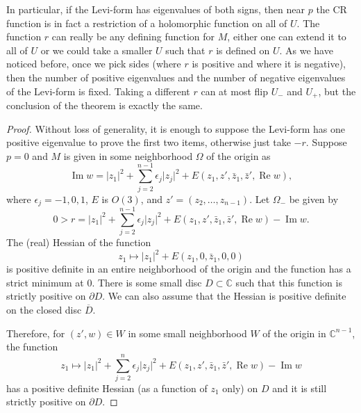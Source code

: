\documentclass[12pt,openany]{book}
\renewcommand{\Re}{\operatorname{Re}}
\renewcommand{\Im}{\operatorname{Im}}
\newcommand{\sabs}[1]{\lvert {#1} \rvert}
\newcommand{\C}{{\mathbb{C}}}
\theoremstyle{plain}
\theoremstyle{remark}
\theoremstyle{definition}
\theoremstyle{exercise}
\theoremstyle{example}
\begin{document}
In particular, if the Levi-form has eigenvalues of both signs,
then near $p$ the CR function is in fact a restriction of a holomorphic
function on all of $U$.  The function $r$ can really be any defining
function for $M$, either one can extend it to all of $U$ or we could take a
smaller $U$ such that $r$ is defined on $U$.  As we have noticed before,
once we pick sides (where $r$ is positive and where it is negative), then
the number of positive eigenvalues and the number of negative eigenvalues of
the Levi-form is fixed.  Taking a different $r$ can at most flip $U_-$
and $U_+$, but the conclusion of the theorem is exactly the same.

\begin{proof}
Without loss of generality, it is enough to suppose the Levi-form has one positive eigenvalue to prove the
first two items, otherwise just take $-r$.
Suppose $p = 0$ and $M$ is given in some neighborhood
$\Omega$ of the origin as
\begin{equation*}
\Im w = \sabs{z_1}^2 + \sum_{j=2}^{n-1} \epsilon_j \sabs{z_j}^2 +
E(z_1,z',\bar{z}_1,\bar{z}',\Re w) ,
\end{equation*}
where $\epsilon_j = -1,0,1$, $E$ is $O(3)$, and $z' =
(z_2,\ldots,z_{n-1})$.  Let $\Omega_-$ be given by
\begin{equation*}
0 > r = \sabs{z_1}^2 + \sum_{j=2}^{n-1} \epsilon_j \sabs{z_j}^2 +
E(z_1,z',\bar{z}_1,\bar{z}',\Re w) - \Im w .
\end{equation*}
The (real) Hessian of the function
\begin{equation*}
z_1 \mapsto \sabs{z_1}^2 +
E(z_1,0,\bar{z}_1,0,0) 
\end{equation*}
is positive definite in an entire
neighborhood of the origin and the function has a strict minimum at 0.
There is some small disc $D \subset \C$ such
that this function is strictly positive on $\partial D$.  We can also assume
that the Hessian is positive definite on the closed disc $\overline{D}$.

Therefore,
for $(z',w) \in W$ in some small neighborhood $W$ of the origin in $\C^{n-1}$, the 
function
\begin{equation*}
z_1 \mapsto \sabs{z_1}^2 + \sum_{j=2}^n \epsilon_j \sabs{z_j}^2 +
E(z_1,z',\bar{z}_1,\bar{z}',\Re w) - \Im w
\end{equation*}
has a positive definite Hessian (as a function of $z_1$ only) on $D$ and
it is still strictly positive on $\partial D$.


\end{proof}
\end{document}
